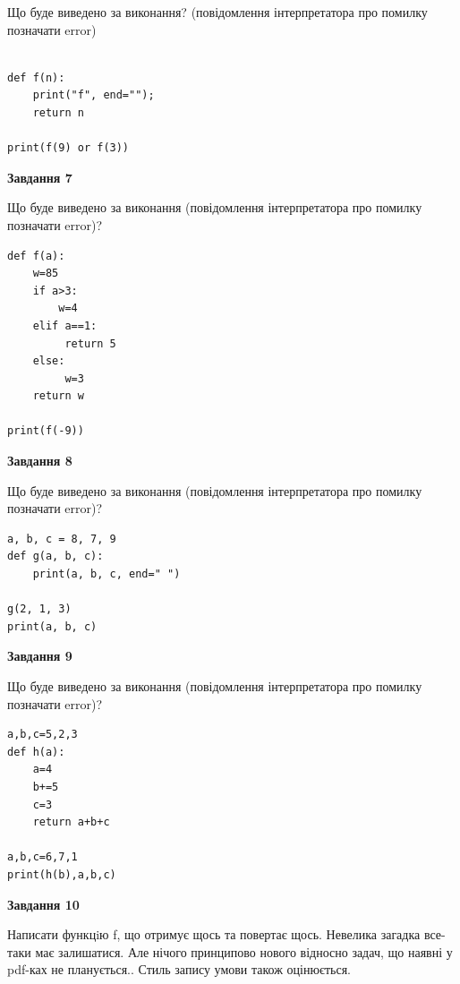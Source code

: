 \documentclass[12pt, ukrainian]{article}
\begin{document}
{\begin {large}
Що буде виведено за виконання? (повідомлення інтерпретатора про помилку позначати error)\par
\begin{verbatim}

def f(n):
    print("f", end="");
    return n

print(f(9) or f(3))
\end{verbatim}

{\begin {center}\textbf{Завдання 7}\end {center}}

Що буде виведено за виконання (повідомлення інтерпретатора про помилку позначати error)?\par
\begin{verbatim}
def f(a):
    w=85
    if a>3: 
        w=4
    elif a==1:
         return 5
    else:
         w=3
    return w

print(f(-9))
\end{verbatim}

{\begin {center}\textbf{Завдання 8}\end {center}}

Що буде виведено за виконання (повідомлення інтерпретатора про помилку позначати error)?\par
\begin{verbatim}
a, b, c = 8, 7, 9
def g(a, b, c):
    print(a, b, c, end=" ")

g(2, 1, 3)
print(a, b, c)
\end{verbatim}

{\begin {center}\textbf{Завдання 9}\end {center}}

Що буде виведено за виконання (повідомлення інтерпретатора про помилку позначати error)?\par
\begin{verbatim}
a,b,c=5,2,3
def h(a):
    a=4
    b+=5
    c=3
    return a+b+c

a,b,c=6,7,1
print(h(b),a,b,c)
\end{verbatim}

{\begin {center}\textbf{Завдання 10}\end {center}}


Написати функцiю f, що отримує щось та повертає щось. Невелика загадка все-таки має залишатися. Але нічого принципово нового відносно задач, що наявні у pdf-ках не планується.. Стиль запису умови також оцінюється.\par
\end {large}}
\newpage
\end{document}
